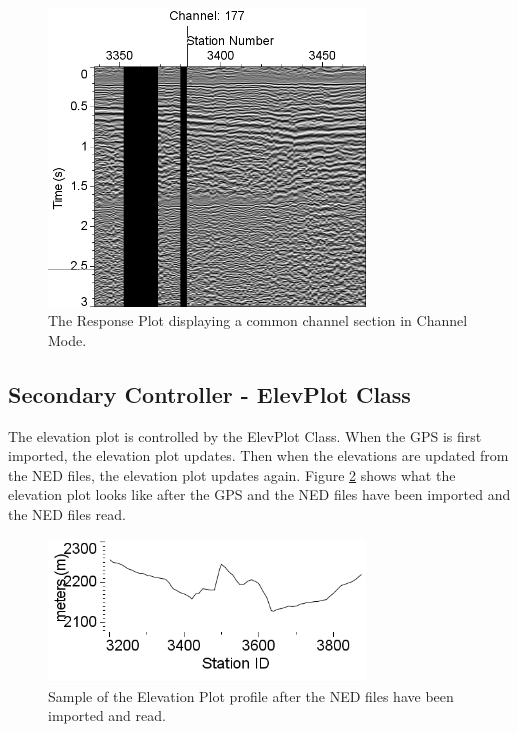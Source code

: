\documentclass[12pt]{article}
\begin{document}
\begin{figure}[H]
\centering
\includegraphics[width=0.75\textwidth]{./figs/fig5.png}
\caption{The Response Plot displaying a common channel section in Channel Mode.}
\label{FIG:RPC}
\end{figure}

\subsection{Secondary Controller - ElevPlot Class}

The elevation plot is controlled by the ElevPlot Class. When the GPS is first imported, the elevation plot updates. Then when the elevations are updated from the NED files, the elevation plot updates again. Figure \ref{FIG:EP} shows what the elevation plot looks like after the GPS and the NED files have been imported and the NED files read.

\begin{figure}[H]
\centering
\includegraphics[width=0.75\textwidth]{figs/fig2.png}
\caption{Sample of the Elevation Plot profile after the NED files have been imported and read.}
\label{FIG:EP}
\end{figure}
\end{document}
